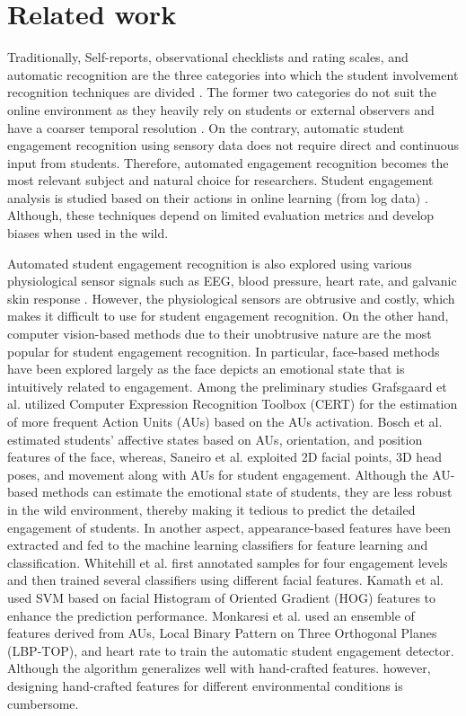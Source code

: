 \section{Related work}
\label{sec:Related work}
Traditionally, Self-reports, observational checklists and rating scales, and automatic recognition are the three categories into which the student involvement recognition techniques are divided \cite{whitehill2014faces}. The former two categories do not suit the online environment as they heavily rely on students or external observers and have a coarser temporal resolution \cite{d2006predicting, o2010development}. On the contrary, automatic student engagement recognition using sensory data does not require direct and continuous input from students. Therefore, automated engagement recognition becomes the most relevant 
 subject and natural choice for researchers. Student engagement analysis is studied based on their actions in online learning  (from log data) \cite{5518758,aluja2019measuring}. Although, these techniques depend on limited evaluation metrics and develop biases when used in the wild. 
 \par Automated student engagement recognition is also explored using various physiological sensor signals such as EEG, blood pressure, heart rate, and galvanic skin response \cite{monkaresi2016automated, fairclough2006prediction, khedher2019tracking}. However, the physiological sensors are obtrusive and costly, which makes it difficult to use for student engagement recognition. On the other hand, computer vision-based methods due to their unobtrusive nature are the most popular for student engagement recognition. In particular, face-based methods have been explored largely as the face depicts an emotional state that is intuitively related to engagement. Among the preliminary studies Grafsgaard et al. \cite{6681424} utilized Computer Expression Recognition Toolbox (CERT) for the estimation of more frequent Action Units (AUs) based on the AUs activation. Bosch et al. \cite{bosch2015automatic} estimated students' affective states based on AUs, orientation, and position features of the face, whereas, Saneiro et al. \cite{saneiro2014towards} exploited 2D facial points, 3D head poses, and movement along with AUs for student engagement. Although the AU-based methods can estimate the emotional state of students, they are less robust in the wild environment, thereby making it tedious to predict the detailed engagement of students. In another aspect, appearance-based features have been extracted and fed to the machine learning classifiers for feature learning and classification. Whitehill et al. \cite{whitehill2014faces} first annotated samples for four engagement levels and then trained several classifiers using different facial features. Kamath et al. \cite{kamath2016crowdsourced} used SVM based on facial Histogram of Oriented Gradient (HOG) features to enhance the prediction performance. Monkaresi et al. \cite{monkaresi2016automated} used an ensemble of features derived from AUs, Local Binary Pattern on Three Orthogonal Planes (LBP-TOP), and heart rate to train the automatic student engagement detector. Although the algorithm generalizes well with hand-crafted features. however, designing hand-crafted features for different environmental conditions is cumbersome.

